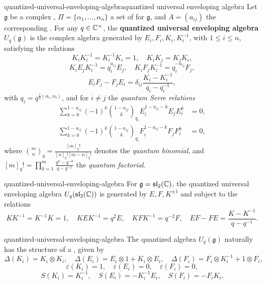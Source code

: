 \begin{topic}{quantized-universal-enveloping-algebra}{quantized universal enveloping algebra}
    Let $\mathfrak{g}$ be a complex , $\Pi = \{ \alpha_1, \ldots, \alpha_n \}$ a set of  for $\mathfrak{g}$, and $A = (a_{ij})$ the corresponding . For any $q \in \mathbb{C}^\times$, the \textbf{quantized universal enveloping algebra} $U_q(\mathfrak{g})$ is the complex algebra generated by $E_i, F_i, K_i, K_i^{-1}$, with $1 \le i \le n$, satisfying the relations
    \[ K_i K_i^{-1} = K_i^{-1} K_i = 1, \quad K_i K_j = K_j K_i , \]
    \[ K_i E_j K_i^{-1} = q_{i}^{a_{i j}} E_j, \quad K_i F_j K_i^{-1} = q_{i}^{-a_{i j}} F_j , \]
    \[ E_i F_j - F_j E_i = \delta_{i j} \frac{K_i - K_i^{-1}}{q_i - q_i^{-1}} , \]
    with $q_i = q^{\frac{1}{2} (\alpha_i, \alpha_i)}$, and for $i \ne j$ the \textit{quantum Serre relations}
    \[ \begin{aligned}
        \sum_{k = 0}^{1 - a_{i j}} (-1)^k \binom{1 - a_{i j}}{k}_{q_i} E_i^{1 - a_{i j} - k} E_j E_i^k &= 0 , \\
        \sum_{k = 0}^{1 - a_{i j}} (-1)^k \binom{1 - a_{i j}}{k}_{q_i} F_i^{1 - a_{i j} - k} F_j F_i^k &= 0 ,
    \end{aligned} \]
    where $\binom{m}{n}_q = \frac{[m]_q!}{[n]_q! [m - n]_q!}$ denotes the \textit{quantum binomial}, and $[m]_q! = \prod_{k = 1}^{m} \frac{q^k - q^{-k}}{q - q^{-1}}$ the \textit{quantum factorial}.
\end{topic}

\begin{example}{quantized-universal-enveloping-algebra}
    For $\mathfrak{g} = \mathfrak{sl}_2(\mathbb{C})$, the quantized universal enveloping algebra $U_q(\mathfrak{sl}_2(\mathbb{C}))$ is generated by $E, F, K^{\pm 1}$ and subject to the relations
    \[ KK^{-1} = K^{-1} K = 1, \quad KEK^{-1} = q^2 E, \quad KFK^{-1} = q^{-2} F, \quad EF - FE = \frac{K - K^{-1}}{q - q^{-1}} . \]
\end{example}

\begin{example}{quantized-universal-enveloping-algebra}
    The quantized algebra $U_q(\mathfrak{g})$ naturally has the structure of a , given by
    \[ \Delta(K_i) = K_i \otimes K_i, \quad \Delta(E_i) = E_i \otimes 1 + K_i \otimes E_i, \quad \Delta(F_i) = F_i \otimes K_i^{-1} + 1 \otimes F_i , \]
    \[ \varepsilon(K_i) = 1, \quad \varepsilon(E_i) = 0, \quad \varepsilon(F_i) = 0 , \]
    \[ S(K_i) = K_i^{-1}, \quad S(E_i) = -K_i^{-1} E_i, \quad S(F_i) = - F_i K_i . \]
\end{example}


